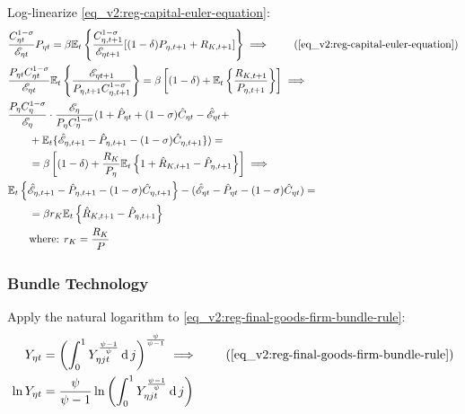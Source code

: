 \documentclass[../thesis.tex]{subfiles}
\begin{document}
Log-linearize \ref{eq_v2:reg-capital-euler-equation}:
	\begin{alignat}{2}
		& \frac{ C_{\eta t}^{1-\sigma}}{ \te} P_{\eta t} = \beta \mathbb{E}_t \left\{ \frac{ C_{\eta, t+1}^{1-\sigma}}{ \te[t+1]} [(1-\delta) P_{\eta, t+1} + R_{K,t+1}] \right\} \implies \tag{\ref{eq_v2:reg-capital-euler-equation}} \\
		& \frac{P_{\eta t} C_{\eta t}^{1-\sigma}}{\te} \mathbb{E}_t \left\{ \frac{\te[t+1]}{P_{\eta, t+1} C_{\eta, t+1}^{1-\sigma}} \right\} = \beta \left[ (1-\delta) + \mathbb{E}_t \left\{ \frac{R_{K,t+1}}{P_{\eta, t+1}} \right\} \right] \implies \nonumber \\
		& \frac{P_{\eta} C_{\eta}^{1-\sigma}}{\te[]} \cdot \frac{\te[]}{P_{\eta} C_{\eta}^{1-\sigma}} (1 + \hat{P}_{\eta t} + (1 -\sigma) \hat{C}_{\eta t} - \hat{\mathscr{E}}_{\eta t} + \nonumber \\ 
		& \qquad + \E \{\hat{\mathscr{E}}_{\eta, t+1} - \hat{P}_{\eta, t+1} - (1 -\sigma) \hat{C}_{\eta, t+1}\}) = \nonumber \\
		& \qquad = \beta \left[ (1-\delta) + \frac{R_{K}}{P_{\eta}} \mathbb{E}_t \left\{ 1 + \hat{R}_{K, t+1} -\hat{P}_{\eta, t+1} \right\} \right] \implies \nonumber \\
		& \E \left\{ \hat{\mathscr{E}}_{\eta, t+1} - \hat{P}_{\eta, t+1}  - (1 -\sigma) \hat{C}_{\eta, t+1} \right\} - (\hat{\mathscr{E}}_{\eta t} - \hat{P}_{\eta t} - (1 -\sigma) \hat{C}_{\eta t}) = \nonumber \\
		& \qquad = \beta r_{K} \mathbb{E}_t \left\{ \hat{R}_{K, t+1} - \hat{P}_{\eta, t+1} \right\} \label{eq_v2:reg-ll-capital-euler-equation} \\
		& \qquad \text{where: } r_{K} = \frac{R_{K}}{P_{}} \label{eq_v2:reg-rk}
	\end{alignat}
	

	\subsubsection*{Bundle Technology}

Apply the natural logarithm to \ref{eq_v2:reg-final-goods-firm-bundle-rule}:
\begin{align}
	Y_{\eta t} &= \left( \int_{0}^{1} Y_{\eta jt}^{\frac{\psi-1}{\psi}} \dif j \right)^{\frac{\psi}{\psi-1}} \implies  \tag{\ref{eq_v2:reg-final-goods-firm-bundle-rule}} \\
	\ln{Y_{\eta t}} &= {\frac{\psi}{\psi-1}} \ln{\left( \int_{0}^{1} Y_{\eta jt}^{\frac{\psi-1}{\psi}} \dif j \right)} \nonumber
\end{align}
\end{document}
